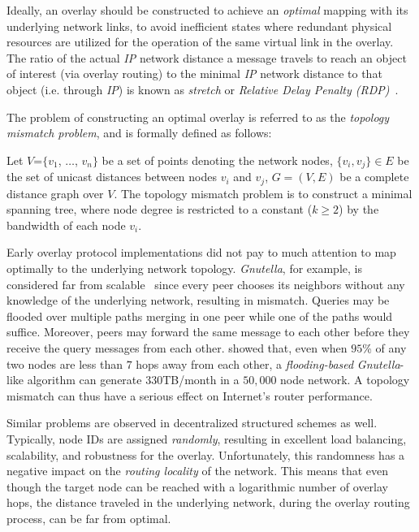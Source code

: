 Ideally, an overlay should be constructed to achieve an \emph{optimal} 
mapping with its underlying network links, to avoid
inefficient states where redundant physical resources are utilized for the
operation of the same virtual link in the overlay. The ratio of the actual
\emph{IP} network distance a message travels to reach an object of interest
(via overlay routing) to the minimal \emph{IP} network distance to that object
(i.e. through \emph{IP}) is known as \emph{stretch} or
\emph{Relative Delay Penalty (RDP)}~\cite{CRZ2000}.

The problem of constructing an optimal overlay is referred to as the
\emph{topology mismatch problem}, and is formally defined as follows:

\begin{definition}
Let $V$=$\{v_1$, $\dots$, $v_n\}$ be a set of points denoting the network nodes,
$\{v_i, v_j\} \in E$ be the set of unicast distances between nodes $v_i$ and
$v_j$, $G=(V,E)$ be a complete distance graph over $V$. The topology mismatch
problem is to construct a minimal spanning tree, where node degree is
restricted to a constant ($k\geq 2$) by the bandwidth of each node $v_i$.
\end{definition}

Early overlay protocol implementations did not pay to much attention to map
optimally to the underlying network topology. {\sl Gnutella}, for example, is
considered far from scalable~\cite{ritter_gnucantscale_2001} since every peer
chooses its neighbors without any knowledge of the underlying
network, resulting in mismatch. 
Queries may be flooded over multiple paths merging in one peer 
while one of the paths would suffice.  
Moreover, peers may forward the same message to each other
before they receive the query messages from each other.
\cite{matei_mapgnutella_2002} showed that, even when $95$\% of any two nodes 
are less than $7$ hops away from each other, 
a \emph{flooding-based} {\sl Gnutella}-like algorithm 
can generate $330$TB/month in a $50,000$ node network. 
A topology mismatch can thus have a serious effect 
on Internet's router performance.

Similar problems are observed in decentralized structured schemes as well.
Typically, node IDs are assigned \emph{randomly}, resulting in excellent load
balancing, scalability, and robustness for the overlay. Unfortunately, this
randomness has a negative impact on the \emph{routing locality} of the network.
This means that even though the target node can be reached with a logarithmic
number of overlay hops, the distance traveled in the underlying network, 
during the overlay routing process, can be far from optimal.  

